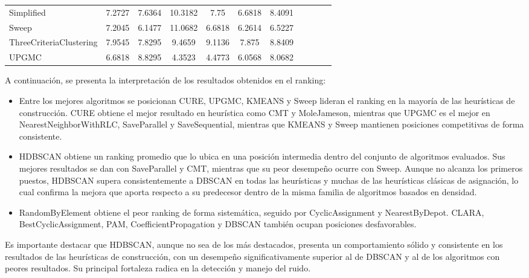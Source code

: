 \begin{landscape}
\begin{table}[H]
\begin{tabular}{@{}lcccccccccc@{}}
    Simplified & 7.2727 & 7.6364 & 10.3182 & 7.75  & 6.6818 & 8.4091 \\
    Sweep & 7.2045 & 6.1477 & 11.0682 & 6.6818 & 6.2614 & 6.5227 \\
    ThreeCriteriaClustering & 7.9545 & 7.8295 & 9.4659 & 9.1136 & 7.875 & 8.8409 \\
    UPGMC & 6.6818 & 8.8295 & \cellcolor[rgb]{ 0,  .69,  .314}4.3523 & \cellcolor[rgb]{ 0,  .69,  .314}4.4773 & \cellcolor[rgb]{ 0,  .69,  .314}6.0568 & 8.0682 \\
\bottomrule
\end{tabular}
\end{table}
	\end{landscape}
\clearpage

A continuaci\'on, se presenta la interpretaci\'on de los resultados obtenidos en el ranking:

\begin{itemize}
  \item Entre los mejores algoritmos se posicionan CURE, UPGMC, KMEANS y Sweep lideran el ranking en la mayor\'ia de las heur\'isticas de construcci\'on. CURE obtiene el mejor resultado en heurística como CMT y MoleJameson, mientras que UPGMC es el mejor en NearestNeighborWithRLC, SaveParallel y SaveSequential, mientras que KMEANS y Sweep mantienen posiciones competitivas de forma consistente.
  
  \item HDBSCAN obtiene un ranking promedio que lo ubica en una posici\'on intermedia dentro del conjunto de algoritmos evaluados. Sus mejores resultados se dan con SaveParallel y CMT, mientras que su peor desempe\~no ocurre con Sweep. Aunque no alcanza los primeros puestos, HDBSCAN supera consistentemente a DBSCAN en todas las heur\'isticas y muchas de las heurísticas clásicas de asignación, lo cual confirma la mejora que aporta respecto a su predecesor dentro de la misma familia de algoritmos basados en densidad.
  
  \item RandomByElement obtiene el peor ranking de forma sistem\'atica, seguido por CyclicAssignment y NearestByDepot. CLARA, BestCyclicAssignment, PAM, CoefficientPropagation y DBSCAN tambi\'en ocupan posiciones desfavorables.
\end{itemize}

Es importante destacar que HDBSCAN, aunque no sea de los más destacados, presenta un comportamiento s\'olido y consistente en los resultados de las heurísticas de construcción, con un desempe\~no significativamente superior al de DBSCAN y al de los algoritmos con peores resultados. Su principal fortaleza radica en la detecci\'on y manejo del ruido.

